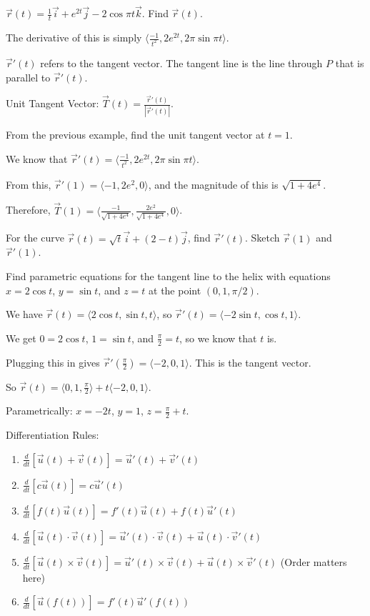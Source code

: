 \documentclass[../calc3.tex]{subfiles}
\begin{document}
\begin{example}
    $\vec{r}(t) = \frac{1}{t}\vec{i}+e^{2t}\vec{j}-2\cos\pi t\vec{k}$. Find $\vec{r}(t)$.

    The derivative of this is simply $\langle \frac{-1}{t^2},2e^{2t}, 2\pi\sin\pi t\rangle$.
\end{example}

$\vec{r}'(t)$ refers to the tangent vector. The tangent line is the line through $P$ that is parallel to $\vec{r}'(t)$. 

Unit Tangent Vector: $\vec{T}(t)=\frac{\vec{r}'(t)}{|\vec{r}'(t)|}$.

\begin{example}
    From the previous example, find the unit tangent vector at $t=1$.

    We know that $\vec{r}'(t)=\langle \frac{-1}{t^2},2e^{2t}, 2\pi\sin\pi t\rangle$. 

    From this, $\vec{r}'(1)=\langle -1,2e^2,0\rangle$, and the magnitude of this is $\sqrt{1+4e^4}$.

    Therefore, $\vec{T}(1)=\langle \frac{-1}{\sqrt{1+4e^4}}, \frac{2e^2}{\sqrt{1+4e^4}}, 0\rangle$.
\end{example}

\ex For the curve $\vec{r}(t)=\sqrt{t}\vec{i}+(2-t)\vec{j}$, find $\vec{r}'(t)$. Sketch $\vec{r}(1)$ and $\vec{r}'(1)$.

\begin{example}
    Find parametric equations for the tangent line to the helix with equations $x=2\cos t$, $y=\sin t$, and $z=t$ at the point $(0,1,\pi/2)$.

    We have $\vec{r}(t)=\langle 2\cos t,\sin t, t\rangle$, so $\vec{r}'(t)=\langle -2\sin t,\cos t,1\rangle$.

    We get $0=2\cos t$, $1=\sin t$, and $\frac{\pi}{2}=t$, so we know that $t$ is.
    
    Plugging this in gives $\vec{r}'\left(\frac{\pi}{2}\right) = \langle -2,0,1\rangle$. This is the tangent vector.

    So $\vec{r}(t)=\langle 0,1,\frac{\pi}{2}\rangle + t\langle -2,0,1\rangle$. 

    Parametrically: $x=-2t$, $y=1$, $z=\frac{\pi}{2}+t$.
\end{example}

Differentiation Rules:
\begin{enumerate}
    \item $\frac{d}{dt}[\vec{u}(t)+\vec{v}(t)]=\vec{u}'(t)+\vec{v}'(t)$
    \item $\frac{d}{dt}[c\vec{u}(t)]=c\vec{u}'(t)$
    \item $\frac{d}{dt}[f(t)\vec{u}(t)]=f'(t)\vec{u}(t)+f(t)\vec{u}'(t)$
    \item $\frac{d}{dt}[\vec{u}(t)\cdot \vec{v}(t)]=\vec{u}'(t)\cdot\vec{v}(t)+\vec{u}(t)\cdot \vec{v}'(t)$
    \item $\frac{d}{dt}[\vec{u}(t)\times \vec{v}(t)]=\vec{u}'(t)\times \vec{v}(t)+\vec{u}(t)\times \vec{v}'(t)$ (Order matters here)
    \item $\frac{d}{dt}[\vec{u}(f(t))]=f'(t)\vec{u}'(f(t))$
\end{enumerate}
\end{document}

